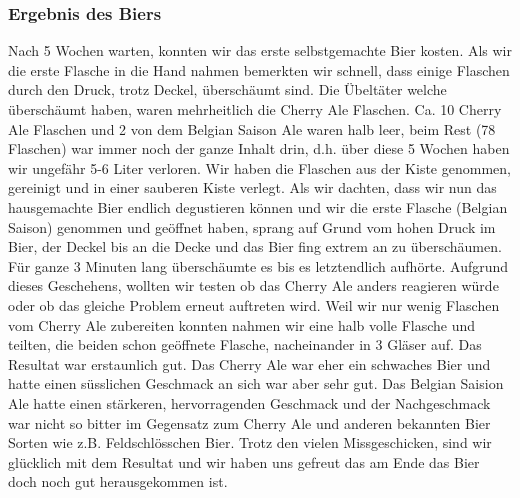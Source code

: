 \subsubsection{Ergebnis des Biers}
Nach 5 Wochen warten, konnten wir das erste selbstgemachte Bier kosten. Als wir die erste Flasche in die Hand nahmen bemerkten wir schnell, dass einige Flaschen durch den Druck, trotz Deckel, überschäumt sind. Die Übeltäter welche überschäumt haben, waren mehrheitlich die Cherry Ale Flaschen. Ca. 10 Cherry Ale Flaschen und 2 von dem Belgian Saison Ale waren halb leer, beim Rest (78 Flaschen) war immer noch der ganze Inhalt drin, d.h. über diese 5 Wochen haben wir ungefähr 5-6 Liter verloren. Wir haben die Flaschen aus der Kiste genommen, gereinigt und in einer sauberen Kiste verlegt. Als wir dachten, dass wir nun das hausgemachte Bier endlich degustieren können und wir die erste Flasche (Belgian Saison) genommen und geöffnet haben, sprang auf Grund vom hohen Druck im Bier, der Deckel bis an die Decke und das Bier fing extrem an zu überschäumen. Für ganze 3 Minuten lang überschäumte es bis es letztendlich aufhörte. Aufgrund dieses Geschehens, wollten wir testen ob das Cherry Ale anders reagieren würde oder ob das gleiche Problem erneut auftreten wird. Weil wir nur wenig Flaschen vom Cherry Ale zubereiten konnten nahmen wir eine halb volle Flasche  und teilten, die beiden schon geöffnete Flasche, nacheinander in 3 Gläser auf. Das Resultat war erstaunlich gut. Das Cherry Ale war eher ein schwaches Bier und hatte einen süsslichen Geschmack an sich war aber sehr gut. Das Belgian Saision Ale hatte einen stärkeren, hervorragenden Geschmack und der Nachgeschmack war nicht so bitter im Gegensatz zum Cherry Ale und anderen bekannten Bier Sorten wie z.B. Feldschlösschen Bier. Trotz den vielen Missgeschicken, sind wir glücklich mit dem Resultat und wir haben uns gefreut das am Ende das Bier doch noch gut herausgekommen ist. 